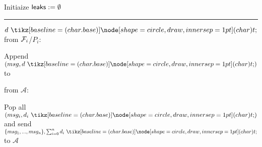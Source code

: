 \begin{bbox}[title={\textbf{Wrapper} $\mathcal{W}_{\msf{leak}}$} ]

Initiaize ${\mathsf {leaks}} := \emptyset$

\vspace{2mm} \hrule \vspace{2mm}

\OnInput {} $d \token$ from $\mathcal{F}_i$/$P_i$:

	\begin{ritemize}
		\item Append $(msg, d \token)$ to 
	\end{ritemize}

\OnInput {} from $\mathcal{A}$:

	\begin{ritemize}
		\item Pop all $(msg_i, d_i \token)$ and send $\{msg_1,...,msg_n\}, \sum_{i=0}^{n} d_i \token$ to $\mathcal{A}$
	\end{ritemize}

\end{bbox}
